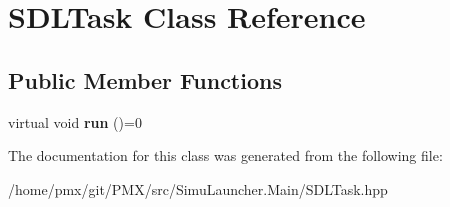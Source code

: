 \hypertarget{classSDLTask}{}\section{S\+D\+L\+Task Class Reference}
\label{classSDLTask}
\subsection*{Public Member Functions}
\begin{DoxyCompactItemize}
\item 
\mbox{\label{classSDLTask_ac473937901b135ab8664ea4cb75e0a5e}} 
virtual void {\bfseries run} ()=0
\end{DoxyCompactItemize}


The documentation for this class was generated from the following file\+:\begin{DoxyCompactItemize}
\item 
/home/pmx/git/\+P\+M\+X/src/\+Simu\+Launcher.\+Main/S\+D\+L\+Task.\+hpp\end{DoxyCompactItemize}
